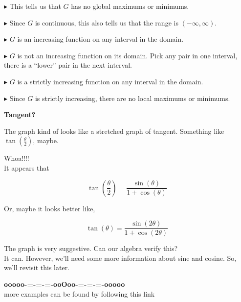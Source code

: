 \documentclass{ximera}
\begin{document}
$\blacktriangleright$ This tells us that $G$ has no global maximums or minimums.  

$\blacktriangleright$ Since $G$ is continuous, this also tells us that the range is $(-\infty, \infty)$.  




$\blacktriangleright$ $G$ is an increasing function on any interval in the domain. 


$\blacktriangleright$ $G$ is not an increasing function on its domain. Pick any pair in one interval, there is a ``lower'' pair in the next interval.


$\blacktriangleright$ $G$ is a strictly increasing function on any interval in the domain. 


$\blacktriangleright$ Since $G$ is strictly increasing, there are no local maximums or minimums.









\begin{observation}   \textbf{Tangent?}


The graph kind of looks like a stretched graph of tangent.  Something like $\tan\left( \frac{\theta}{2} \right)$, maybe.






\begin{center}
\end{center}


Whoa!!!! \\


It appears that


\[   \tan\left( \frac{\theta}{2} \right)   = \frac{\sin(\theta)}{1 + \cos(\theta)}   \]




Or, maybe it looks better like, 




\[   \tan(\theta)   = \frac{\sin(2\theta)}{1 + \cos(2\theta)}   \]





The graph is very suggestive.  Can our algebra verify this? \\


It can.  However, we'll need some more information about sine and cosine.  So, we'll revisit this later.



\end{observation}

















\begin{center}
\textbf{\textcolor{green!50!black}{ooooo-=-=-=-ooOoo-=-=-=-ooooo}} \\

more examples can be found by following this link\\ 

\end{center}
\end{document}
